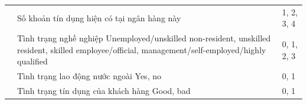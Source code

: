 \begin{longtable}{V{2.9cm}D{9.3cm}S{2.4cm}}
     & Số khoản tín dụng hiện có tại ngân hàng này & 1, 2, 3, 4 \\
     & Tình trạng nghề nghiệp \newline Unemployed/unskilled non-resident, unskilled resident, skilled employee/official, management/self-employed/highly qualified & 0, 1, 2, 3 \\
     & Tình trạng lao động nước ngoài \newline Yes, no & 0, 1 \\
     & Tình trạng tín dụng của khách hàng \newline Good, bad & 0, 1 \\
 
\end{longtable}
 
